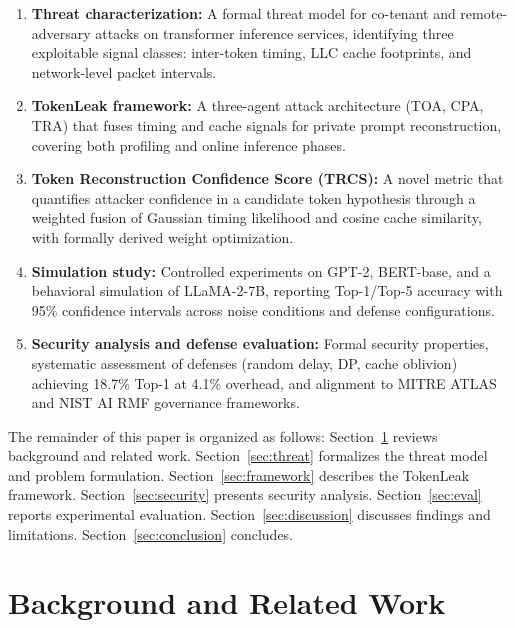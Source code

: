 \documentclass[journal,10pt,twocolumn]{IEEEtran}
\begin{document}
\begin{enumerate}
  \item \textbf{Threat characterization:} A formal threat model
    for co-tenant and remote-adversary attacks on transformer
    inference services, identifying three exploitable signal
    classes: inter-token timing, LLC cache footprints, and
    network-level packet intervals.

  \item \textbf{TokenLeak framework:} A three-agent
    attack architecture (TOA, CPA, TRA) that fuses timing and
    cache signals for private prompt reconstruction, covering
    both profiling and online inference phases.

  \item \textbf{Token Reconstruction Confidence Score (TRCS):}
    A novel metric that quantifies attacker confidence in a
    candidate token hypothesis through a weighted fusion of
    Gaussian timing likelihood and cosine cache similarity,
    with formally derived weight optimization.

  \item \textbf{Simulation study:} Controlled experiments on
    GPT-2, BERT-base, and a behavioral simulation of LLaMA-2-7B,
    reporting Top-1/Top-5 accuracy with 95\% confidence intervals
    across noise conditions and defense configurations.

  \item \textbf{Security analysis and defense evaluation:}
    Formal security properties, systematic assessment of
    defenses (random delay, DP, cache oblivion) achieving
    18.7\% Top-1 at 4.1\% overhead, and alignment to
    MITRE ATLAS and NIST AI RMF governance frameworks.
\end{enumerate}

The remainder of this paper is organized as follows:
Section~\ref{sec:background} reviews background and related work.
Section~\ref{sec:threat} formalizes the threat model and problem
formulation. Section~\ref{sec:framework} describes the TokenLeak
framework. Section~\ref{sec:security} presents security analysis.
Section~\ref{sec:eval} reports experimental evaluation.
Section~\ref{sec:discussion} discusses findings and limitations.
Section~\ref{sec:conclusion} concludes.

\section{Background and Related Work}
\label{sec:background}
\end{document}

